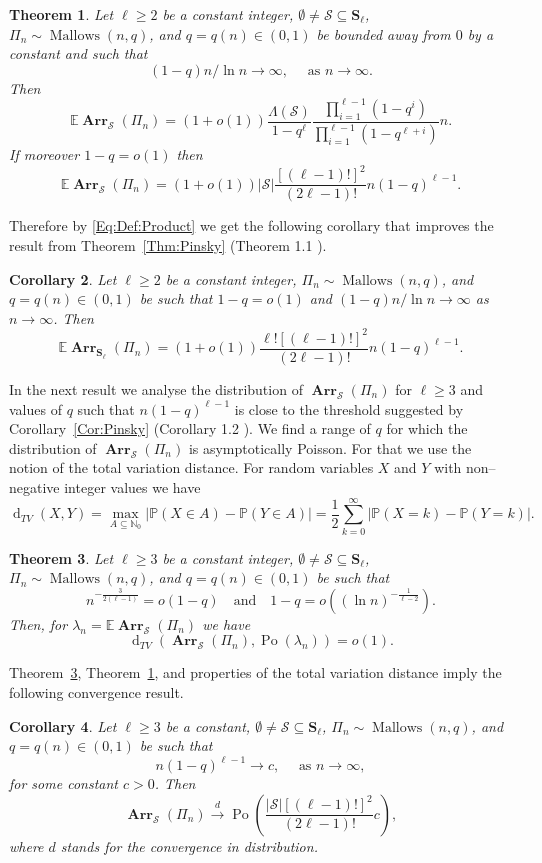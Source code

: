 \documentclass[letterpaper,11pt]{article}
\newtheorem{theorem}{Theorem}[section]
\newtheorem{corollary}[theorem]{Corollary}
\theoremstyle{definition}
\theoremstyle{remark}
\renewcommand{\ge}{\geqslant}
\DeclareMathOperator{\Mallow}{Mallows}
\newcommand{\bE}{\mathbb{E}}
\newcommand{\bS}{\mathbf{S}}
\newcommand{\productO}{\Lambda(\cS)}
\newcommand{\Arr}{\ensuremath{\operatorname{\mathbf{Arr}}}}
\newcommand{\Pra}[1]{\mathbb{P}\left(#1\right)}
\newcommand{\NN}{\mathbb{N}}
\newcommand{\cS}{\mathcal{S}}
\newcommand{\dtv}{\operatorname{d}_{TV}}
\begin{document}
\begin{theorem}\label{Thm:Main:Expected}
	Let $\ell\ge 2$  be a constant integer, $\emptyset\neq \cS\subseteq \bS_\ell$, $\varPi_n\sim \Mallow(n,q)$, and
	$q=q(n)\in (0,1)$ be bounded away from $0$ by a constant and such that \[(1-q)n/\ln n\to \infty,\quad\text{ as }n\to\infty.\]
	Then
	\[
	\bE \Arr_{\cS}(\varPi_n) = (1+o(1)) \frac{\productO}{1-q^\ell}\frac{\prod_{i=1}^{\ell-1}(1-q^i)}{\prod_{i=1}^{\ell-1}(1-q^{\ell+i})}n.
	\]
	If moreover $1-q=o(1)$ then
	\[
	\bE \Arr_{\cS}(\varPi_n) = (1+o(1)) |\cS|\frac{[(\ell-1)!]^2}{(2\ell-1)!}n(1-q)^{\ell-1}. 
	\]	
\end{theorem}
Therefore by \eqref{Eq:Def:Product} we get the following corollary that improves the result from Theorem~\ref{Thm:Pinsky} (Theorem 1.1 \cite{Pinsky2022}). 
\begin{corollary}
	Let $\ell\ge 2$  be a constant integer, $\varPi_n\sim \Mallow(n,q)$, and
	$q=q(n)\in (0,1)$ be such that $1-q=o(1)$ and $(1-q)n/\ln n\to \infty$ as $n\to\infty$. Then
	\[
	\bE\Arr_{\bS_\ell}(\varPi_n) = (1+o(1)) \frac{\ell![(\ell-1)!]^2}{(2\ell-1)!}n(1-q)^{\ell-1}. 
	\]	
\end{corollary}



In the next result we analyse the distribution of $\Arr_{\cS}(\varPi_n)$ for $\ell\ge 3$ and values of $q$ such that $n(1-q)^{\ell-1}
$ is close to the threshold suggested by Corollary~\ref{Cor:Pinsky} (Corollary 1.2 \cite{Pinsky2022}). We find a range of $q$ for which the distribution of $\Arr_{\cS}(\varPi_n)$ is asymptotically Poisson.
For that we use the notion of the total variation distance. For random variables $X$ and $Y$ with non--negative integer values we have
\[\dtv(X,Y)=\max_{A\subseteq \NN_0}|\Pra{X\in A}-\Pra{Y\in A}|=\frac{1}{2}\sum_{k=0}^{\infty}|\Pra{X=k}-\Pra{Y=k}|.\] 
\begin{theorem}\label{Thm:Main:Poisson}
	Let $\ell\ge 3$ be a constant integer, $\emptyset\neq \cS\subseteq \bS_\ell$, $\varPi_n\sim \Mallow(n,q)$, and
	$q=q(n)\in (0,1)$ be such that 
	\begin{equation}\label{Eq:Poisson:q:condition}
		n^{-\frac{3}{2(\ell-1)}}=o(1-q)\quad\text{and}\quad 1-q=o\left((\ln n)^{-\frac{1}{\ell-2}}\right).
	\end{equation}
	Then, for $\lambda_n=\bE \Arr_\cS(\varPi_n)$ we have
	\[\dtv\left(\Arr_{\cS}(\varPi_n),\operatorname{Po}(\lambda_n)\right)=o(1).\]
\end{theorem}
Theorem~\ref{Thm:Main:Poisson}, Theorem~\ref{Thm:Main:Expected}, and properties of the total variation distance imply the following convergence result.
\begin{corollary}
	Let $\ell\ge 3$ be a constant, $\emptyset\neq \cS\subseteq \bS_\ell$, $\varPi_n\sim \Mallow(n,q)$, and
	$q=q(n)\in (0,1)$ be such that \[n(1-q)^{\ell-1}\to c,\quad\text{ as }n\to\infty,\]
	for some constant $c>0$. Then
	\[\Arr_{\cS}(\varPi_n) \stackrel{d}{\rightarrow} \operatorname{Po}\left(\frac{|\cS|[(\ell-1)!]^2}{(2\ell-1)!}c\right),\]
	where $d$ stands for the convergence in distribution.
\end{corollary}
\end{document}
